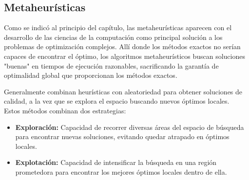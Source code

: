 \documentclass[12pt,a4paper]{book}
\begin{document}
\subsection{Metaheurísticas}
Como se indicó al principio del capítulo, las metaheurísticas\cite{metaheuristicos} aparecen con el desarrollo de las ciencias de la computación como principal solución a los problemas de optimización complejos. Allí donde los métodos exactos no serían capaces de encontrar el óptimo,
los algoritmos metaheurísticos buscan soluciones "buenas" en tiempos de ejecución razonables, sacrificando la garantía de optimalidad global que proporcionan los métodos exactos.

Generalmente combinan heurísticas con aleatoriedad para obtener soluciones de calidad, a la vez que se explora el espacio buscando nuevos óptimos locales.\\
Estos métodos combinan dos estrategias:
\begin{itemize}
    \item \textbf{Exploración:} Capacidad de recorrer diversas áreas del espacio de búsqueda para encontrar nuevas soluciones, evitando quedar atrapado en óptimos locales.
    \item \textbf{Explotación:} Capacidad de intensificar la búsqueda en una región prometedora para encontrar los mejores óptimos locales dentro de ella.
\end{itemize}
\end{document}
